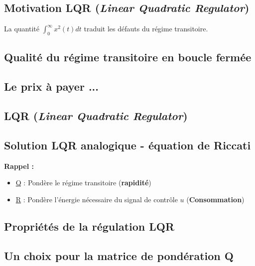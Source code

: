 \documentclass[document.tex]{subfiles}
\begin{document}
\subsection{Motivation LQR (\textit{Linear Quadratic Regulator})}


La quantité $\boxed{\int_0^\infty x^2(t)dt}$ traduit les défauts du régime transitoire.


\subsection{Qualité du régime transitoire en boucle fermée}



\subsection{Le prix à payer  ...}


\subsection{LQR (\textit{Linear Quadratic Regulator})}



\subsection{Solution LQR analogique - équation de Riccati}

\textbf{Rappel :}
\begin{itemize}
\item \underline{Q} : Pondère le régime transitoire (\textbf{rapidité}) 
\item \underline{R} : Pondère l'énergie nécessaire du signal de contrôle $u$ (\textbf{Consommation})
\end{itemize}
\begin{center}
\end{center}


\subsection{Propriétés de la régulation LQR}


\subsection{Un choix pour la matrice de pondération Q}
\end{document}

